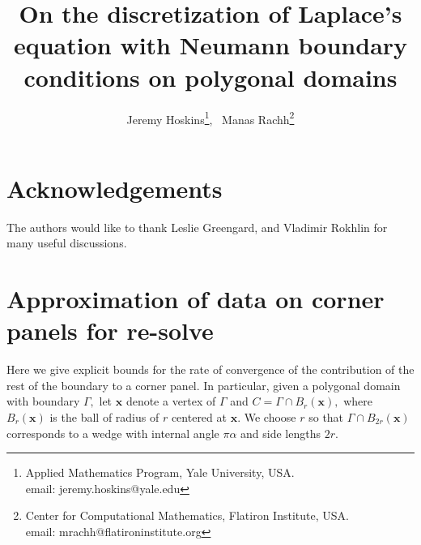 \documentclass[12pt]{article}
\newcommand{\bx}{\boldsymbol{x}}
\begin{document}
 \title{On the discretization of Laplace's equation with Neumann boundary conditions on polygonal domains}
\author{Jeremy Hoskins\thanks{Applied Mathematics Program, Yale University, USA. \\ email: jeremy.hoskins@yale.edu}, \,
Manas Rachh\thanks{Center for Computational Mathematics, Flatiron Institute, USA. \\ email: mrachh@flatironinstitute.org}}
 \maketitle









\section{Acknowledgements}
The authors would like to thank Leslie Greengard, and Vladimir Rokhlin for many useful discussions.

\appendix
\section{Approximation of data on corner panels for re-solve}
Here we give explicit bounds for the rate of convergence of the contribution of the rest of the boundary to a corner panel. In particular, given a polygonal domain with boundary $\Gamma,$ let $\bx$ denote a vertex of $\Gamma$ and $C = \Gamma \cap B_r(\bx),$ where $B_r(\bx)$ is the ball of radius of $r$ centered at $\bx.$ We choose $r$ so that $\Gamma \cap B_{2r}(\bx)$ corresponds to a wedge with internal angle $\pi \alpha$ and side lengths $2r.$ 

\end{document}
